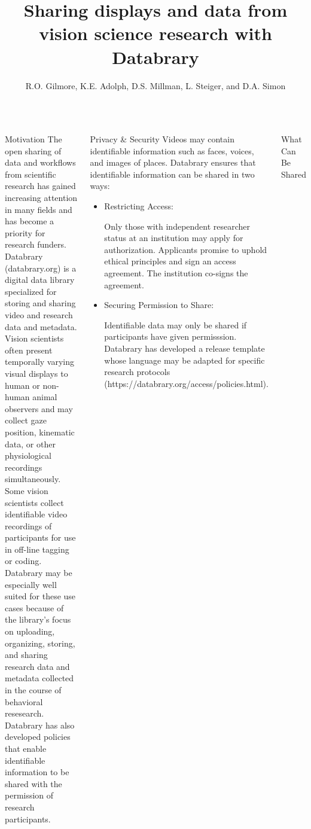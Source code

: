 \documentclass[final]{beamer}
\title{Sharing displays and data from vision science research with Databrary}
\author{R.O. Gilmore, K.E. Adolph, D.S. Millman, L. Steiger, and D.A. Simon}
\date{}
\begin{document}
\begin{frame}{} 

\begin{columns}[t]
		\begin{block}{Motivation}
			The open sharing of data and workflows from scientific research has gained increasing attention in many fields and has become a priority for research funders. 
			Databrary (databrary.org) is a digital data library specialized for storing and sharing video and research data and metadata. Vision scientists often present temporally varying visual displays to human or non-human animal observers and may collect gaze position, kinematic data, or other physiological recordings simultaneously. 
			Some vision scientists collect identifiable video recordings of participants for use in off-line tagging or coding. 
			Databrary may be especially well suited for these use cases because of the library's focus on uploading, organizing, storing, and sharing research data and metadata collected in the course of behavioral resesearch. 
			Databrary has also developed policies that enable identifiable information to be shared with the permission of research participants. 
		\end{block}
		\begin{block}{Privacy \& Security}
			Videos may contain identifiable information such as faces, voices, and images of places. 
			Databrary ensures that identifiable information can be shared in two ways:
			\begin{itemize}
			\item Restricting Access:
				\begin{indent}
					Only those with independent researcher status at an institution may apply for authorization. 
					Applicants promise to uphold ethical principles and sign an access agreement. The institution co-signs the agreement.
				\end{indent}
			\item Securing Permission to Share:
				\begin{indent}
					Identifiable data may only be shared if participants have given permisssion.
					Databrary has developed a release template whose language may be adapted for specific research protocols (https://databrary.org/access/policies.html).
				\end{indent}
			\end{itemize}
		\end{block}
		\begin{block}{What Can Be Shared}

\end{block}
\end{columns}
\end{frame}
\end{document}
